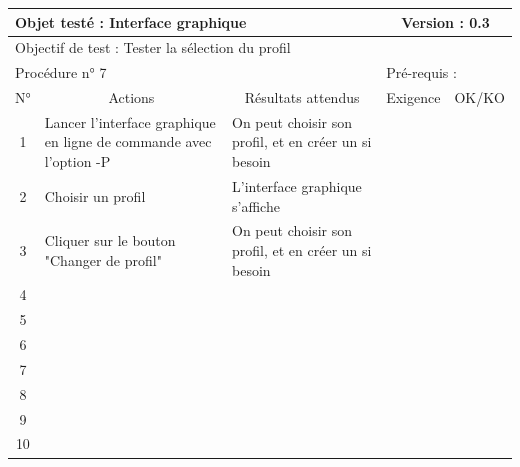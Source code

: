 \documentclass{../res/univ-projet}
\begin{document}
\begin{center}
    \begin{tabular}{|c|p{5cm}|p{5cm}|p{1.5cm}|p{1.5cm}|}
      \hline
      \multicolumn{3}{|l|}{Objet testé : Interface graphique} & \multicolumn{2}{c|}{Version : 0.3}\\ \hline
      \multicolumn{5}{|l|}{Objectif de test : Tester la sélection du profil}\\ \hline
      \multicolumn{3}{|l|}{Procédure n° 7} & \multicolumn{2}{p{3cm}|}{Pré-requis : }\\ \hline
      \multicolumn{1}{|c|}{N°} & \multicolumn{1}{c|}{Actions} & \multicolumn{1}{c|}{Résultats attendus} & 
      \multicolumn{1}{c|}{Exigence} & \multicolumn{1}{c|}{OK/KO}\\ \hline
      1 & Lancer l'interface graphique en ligne de commande avec l'option -P & On peut choisir son profil, et en créer un si besoin &  & \\
      2 & Choisir un profil & L'interface graphique s'affiche &  & \\
      3 & Cliquer sur le bouton "Changer de profil" & On peut choisir son profil, et en créer un si besoin &  & \\ 
	  4 &  &  &  & \\
      5 &  &  &  & \\
	  6 &  &  &  & \\
      7 &  &  &  & \\
      8 &  &  &  & \\
      9 &  &  &  & \\
      10 &  &  &  &\\ 
	\hline
    \end{tabular}
    \vskip 2.2cm




\end{center}
\end{document}
